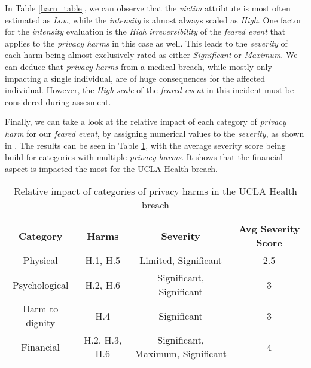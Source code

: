 In Table \ref{harn_table}, we can observe that the \textit{victim} attribtute is most often estimated as \textit{Low}, while the \textit{intensity} is almost always scaled as \textit{High}. One factor for the \textit{intensity} evaluation is the \textit{High} \textit{irreversibility} of the \textit{feared event} that applies to the \textit{privacy harms} in this case as well. This leads to the \textit{severity} of each harm being almost exclusively rated as either \textit{Significant} or \textit{Maximum}. We can deduce that \textit{privacy harms} from a medical breach, while mostly only impacting a single individual, are of huge consequences for the affected individual. However, the \textit{High} \textit{scale} of the \textit{feared event} in this incident must be considered during assesment. 

Finally, we can take a look at the relative impact of each category of \textit{privacy harm} for our \textit{feared event}, by assigning numerical values to the \textit{severity}, as shown in \cite{wairimu2022modelling}. The results can be seen in Table \ref{related_categories}, with the average severity score being build for categories with multiple \textit{privacy harms}. It shows that the financial aspect is impacted the most for the UCLA Health breach.  

\begin{table}[h!]
    \caption{Relative impact of categories of privacy harms in the UCLA Health breach}
    \label{related_categories}
    \centering

    \begin{tabular}{c|c|c|c}
    \hline
        Category & Harms & Severity & Avg Severity Score \\
    \hline
        Physical & H.1, H.5 & Limited, Significant & 2.5 \\
        Psychological & H.2, H.6 & Significant, Significant & 3 \\
        Harm to dignity & H.4 & Significant & 3 \\
        Financial & H.2, H.3, H.6 & Significant, Maximum, Significant & 4 \\
    \hline
    \end{tabular}
\end{table}
